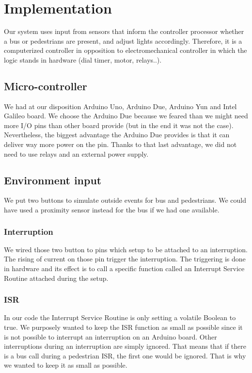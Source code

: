 \section{Implementation}

Our system uses input from sensors that inform the controller processor whether a bus or pedestrians are present, and adjust lights accordingly. Therefore, it is a computerized controller in opposition to electromechanical controller in which the logic stands in hardware (dial timer, motor, relays..).

\subsection{Micro-controller}

We had at our disposition Arduino Uno, Arduino Due, Arduino Yun and Intel Galileo board. We choose the Arduino Due because we feared than we might need more I/O pins than other board provide (but in the end it was not the case). Nevertheless, the biggest advantage the Arduino Due provides is that it can deliver way more power on the pin. Thanks to that last advantage, we did not need to use relays and an external power supply.

\subsection{Environment input}

We put two buttons to simulate outside events for bus and pedestrians. We could have used a proximity sensor instead for the bus if we had one available.

\subsubsection{Interruption}

We wired those two button to pins which setup to be attached to an interruption. The rising of current on those pin trigger the interruption. The triggering is done in hardware and its effect is to call a specific function called an Interrupt Service Routine attached during the setup.

\subsubsection{ISR}

In our code the Interrupt Service Routine is only setting a volatile Boolean to true. We purposely wanted to keep the ISR function as small as possible since it is not possible to interrupt an interruption on an Arduino board. Other interruptions during an interruption are simply ignored. That means that if there is a bus call during a pedestrian ISR, the first one would be ignored. That is why we wanted to keep it as small as possible. 

